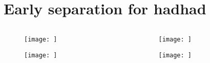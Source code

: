 \documentclass{beamer}
\begin{document}
\section{Early separation for hadhad}

\begin{frame}
    \begin{columns}
        \begin{column}{0.5\textwidth}
            \begin{figure}
                \centering
                \texttt{[image: ]}
            \end{figure}
            \begin{figure}
                \centering
                \texttt{[image: ]}
            \end{figure}
        \end{column}
        \begin{column}{0.5\textwidth}
            \begin{figure}
                \centering
                \texttt{[image: ]}
            \end{figure}
            \begin{figure}
                \centering
                \texttt{[image: ]}
            \end{figure}
        \end{column}
    \end{columns}
\end{frame}
\end{document}
